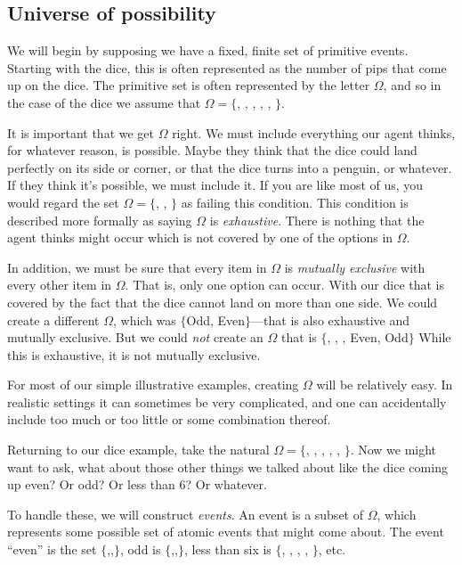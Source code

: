 \subsection{Universe of possibility}

We will begin by supposing we have a fixed, finite set of primitive events.  Starting with the dice, this is often represented as the number of pips that come up on the dice.  The primitive set is often represented by the letter $\Omega$, and so in the case of the dice we assume that $\Omega = \{$, , , , , $\}$.  

It is important that we get $\Omega$ right.  We must include everything our agent thinks, for whatever reason, is possible. Maybe they think that the dice could land perfectly on its side or corner, or that the dice turns into a penguin, or whatever.  If they think it's possible, we must include it.  If you are like most of us, you would regard the set $\Omega = \{$, , $\}$ as failing this condition.  This condition is described more formally as saying $\Omega$ is {\it exhaustive}. There is nothing that the agent thinks might occur which is not covered by one of the options in $\Omega$.  

In addition, we must be sure that every item in $\Omega$ is {\it mutually exclusive} with every other item in $\Omega$.  That is, only one option can occur.  With our dice that is covered by the fact that the dice cannot land on more than one side.  We could create a different $\Omega$, which was $\{$Odd, Even$\}$---that is also exhaustive and mutually exclusive.  But we could {\it not} create an $\Omega$ that is $\{$, , , Even, Odd$\}$  While this is exhaustive, it is not mutually exclusive.

For most of our simple illustrative examples, creating $\Omega$ will be relatively easy.  In realistic settings it can sometimes be very complicated, and one can accidentally include too much or too little or some combination thereof.

Returning to our dice example, take the natural $\Omega = \{$, , , , , $\}$.  Now we might want to ask, what about those other things we talked about like the dice coming up even? Or odd? Or less than 6? Or whatever.

To handle these, we will construct {\it events}.  An event is a subset of $\Omega$, which represents some possible set of atomic events that might come about.  The event ``even'' is the set $\{$,,$\}$, odd is $\{$,,$\}$, less than six is $\{$, , , , $\}$, etc.  

